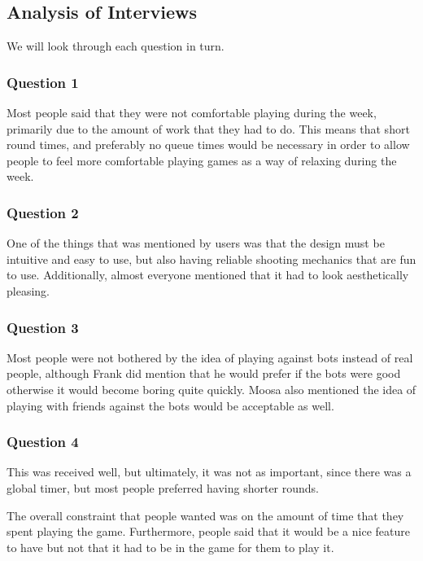\subsection{Analysis of Interviews}

We will look through each question in turn.

\subsubsection{Question 1}

Most people said that they were not comfortable playing during the week, primarily due to the amount of work that they had to do. This means that short round times, and preferably no queue times would be necessary in order to allow people to feel more comfortable playing games as a way of relaxing during the week.

\subsubsection{Question 2}

One of the things that was mentioned by users was that the design must be intuitive and easy to use, but also having reliable shooting mechanics that are fun to use. Additionally, almost everyone mentioned that it had to look aesthetically pleasing.

\subsubsection{Question 3}

Most people were not bothered by the idea of playing against bots instead of real people, although Frank did mention that he would prefer if the bots were good otherwise it would become boring quite quickly. Moosa also mentioned the idea of playing with friends against the bots would be acceptable as well.

\subsubsection{Question 4}

This was received well, but ultimately, it was not as important, since there was a global timer, but most people preferred having shorter rounds.

\vs
The overall constraint that people wanted was on the amount of time that they spent playing the game. Furthermore, people said that it would be a nice feature to have but not that it had to be in the game for them to play it.

